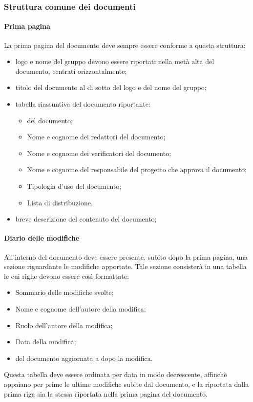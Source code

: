   \subsubsection{Struttura comune dei documenti}
  \paragraph*{Prima pagina}
  La prima pagina del documento deve sempre essere conforme a questa struttura:
  \begin{itemize}
    \item logo e nome del gruppo devono essere riportati nella metà alta del documento, centrati orizzontalmente;
    \item titolo del documento al di sotto del logo e del nome del gruppo;
    \item tabella riassuntiva del documento riportante:
      \begin{itemize}
      \item {} del documento;
      \item Nome e cognome dei redattori del documento;
      \item Nome e cognome dei verificatori del documento;
      \item Nome e cognome del responsabile del progetto che approva il documento;
      \item Tipologia d'uso del documento;
      \item Lista di distribuzione.
      \end{itemize}
    \item breve descrizione del contenuto del documento;
  \end{itemize}

  \paragraph*{Diario delle modifiche}
  All'interno del documento deve essere presente, subito dopo la prima pagina, una sezione riguardante le modifiche apportate. Tale sezione consisterà in una tabella le cui righe devono essere cos\`i formattate:
  \begin{itemize}
  \item Sommario delle modifiche svolte;
  \item Nome e cognome dell'autore della modifica;
  \item Ruolo dell'autore della modifica;
  \item Data della modifica;
  \item {} del documento aggiornata a dopo la modifica.
  \end{itemize}
  Questa tabella deve essere ordinata per data in modo decrescente, affinch\`e appaiano per prime le ultime modifiche subite dal documento, e la  riportata dalla prima riga sia la stessa riportata nella prima pagina del documento.


